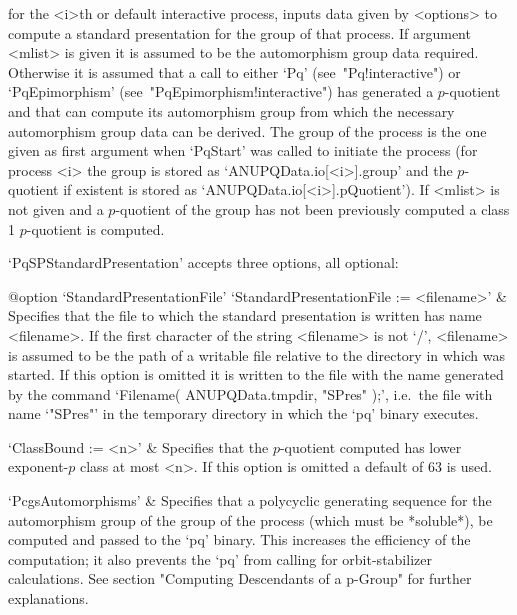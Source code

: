 for the <i>th or default interactive {\ANUPQ} process, inputs data  given
by <options> to compute a standard presentation for  the  group  of  that
process.  If  argument  <mlist>  is  given  it  is  assumed  to  be   the
automorphism group data required. Otherwise it is assumed that a call  to
either      `Pq'      (see~"Pq!interactive")      or      `PqEpimorphism'
(see~"PqEpimorphism!interactive") has generated a $p$-quotient  and  that
{\GAP} can compute  its  automorphism  group  from  which  the  necessary
automorphism group data can be derived. The group of the process  is  the
one given as first argument when `PqStart' was  called  to  initiate  the
process (for process <i> the group is stored as `ANUPQData.io[<i>].group'
and     the     $p$-quotient     if     existent     is     stored     as
`ANUPQData.io[<i>].pQuotient').  If  <mlist>   is   not   given   and   a
$p$-quotient of the group has not been  previously  computed  a  class  1
$p$-quotient is computed.

`PqSPStandardPresentation' accepts three options, all optional:

\beginitems

%
{@option \noexpand`StandardPresentationFile'}
`StandardPresentationFile := <filename>' &
Specifies that the file to which the standard presentation is written has
name <filename>. If the first character of the string <filename>  is  not
`/', <filename> is assumed to be the path of a writable file relative  to
the directory in which {\GAP} was started. If this option is  omitted  it
is written to the file with the name generated by the command  `Filename(
ANUPQData.tmpdir, "SPres" );', i.e.~the file with name `"SPres"'  in  the
temporary directory in which the `pq' binary executes.

`ClassBound := <n>' &
Specifies that the $p$-quotient computed has lower exponent-$p$ class  at
most <n>. If this option is omitted a default of 63 is used.

`PcgsAutomorphisms' &
Specifies that a polycyclic  generating  sequence  for  the  automorphism
group of the group of the process (which must be *soluble*), be  computed
and passed to the `pq' binary.  This  increases  the  efficiency  of  the
computation;  it  also  prevents  the  `pq'  from  calling   {\GAP}   for
orbit-stabilizer calculations. See section "Computing  Descendants  of  a
p-Group" for further explanations.

